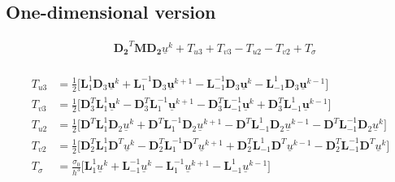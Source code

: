 \documentclass[10pt,a4paper]{article}
\begin{document}
\subsection{One-dimensional version}

\begin{equation}
\begin{split}
&\boldsymbol{D_2}^T \boldsymbol{M}\boldsymbol{D_2}\underline{u}^k +T_{u3} + T_{v3} - T_{u2} - T_{v2}+T_{\sigma} \\
&
\end{split}
\end{equation}

\begin{equation}
\begin{split}
T_{u3} &= \frac{1}{2}\biggl[\boldsymbol{L}_{1}^1 \boldsymbol{D}_3\boldsymbol{\underline{u}}^k+
\boldsymbol{L}_{1}^{-1} \boldsymbol{D}_3\boldsymbol{\underline{u}}^{k+1} -  
\boldsymbol{L}_{-1}^{-1} \boldsymbol{D}_3\boldsymbol{\underline{u}}^k - 
\boldsymbol{L}_{-1}^{1} \boldsymbol{D}_3\boldsymbol{\underline{u}}^{k-1}\biggr] \\
T_{v3} &= \frac{1}{2}\biggl[\boldsymbol{D}^{T}_3\boldsymbol{L}_{1}^1 \boldsymbol{\underline{u}}^k-
\boldsymbol{D}^{T}_3\boldsymbol{L}_{1}^{-1} \boldsymbol{\underline{u}}^{k+1} - \boldsymbol{D}^{T}_3\boldsymbol{L}_{-1}^{-1} \boldsymbol{\underline{u}}^k + \boldsymbol{D}^{T}_3\boldsymbol{L}_{-1}^{1} \boldsymbol{\underline{u}}^{k-1}\biggr] \\
T_{u2} &= \frac{1}{2}\biggl[\boldsymbol{D}^T \boldsymbol{L}_{1}^1 \boldsymbol{D}_2 \underline{u}^k + \boldsymbol{D}^T \boldsymbol{L}_{1}^{-1} \boldsymbol{D}_2 \underline{u}^{k+1} -\boldsymbol{D}^T \boldsymbol{L}_{-1}^1 \boldsymbol{D}_2 \underline{u}^{k-1} - \boldsymbol{D}^T \boldsymbol{L}_{-1}^{-1} \boldsymbol{D}_2 \underline{u}^{k}  \biggr]\\
T_{v2} &= \frac{1}{2}\biggl[\boldsymbol{D}_2^T \boldsymbol{L}_{1}^1  \boldsymbol{D}^T\underline{u}^k - \boldsymbol{D}_2^T \boldsymbol{L}_{1}^{-1}  \boldsymbol{D}^T \underline{u}^{k+1} +
 \boldsymbol{D}_2^T \boldsymbol{L}_{-1}^{1}  \boldsymbol{D}^T \underline{u}^{k-1} -
  \boldsymbol{D}_2^T \boldsymbol{L}_{-1}^{-1}  \boldsymbol{D}^T\underline{u}^{k}  \biggr]\\
T_\sigma &= \frac{\sigma_0}{h^3}\biggl[ \boldsymbol{L}_{1}^1 \underline{u}^{k} +  \boldsymbol{L}_{-1}^{-1} \underline{u}^{k} - \boldsymbol{L}_{1}^{-1} \underline{u}^{k+1}- \boldsymbol{L}_{-1}^{1} \underline{u}^{k-1}\biggr]
\end{split}
\end{equation}
\end{document}
